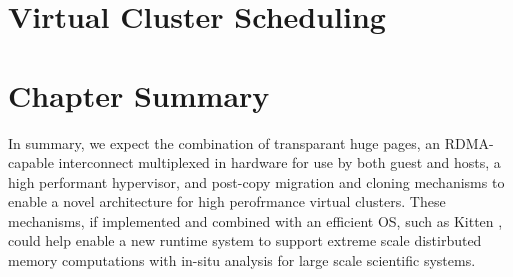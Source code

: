 \section{Virtual Cluster Scheduling}
\label{vcsched}




\section{Chapter Summary}
\label{chap7sum}



In summary, we expect the combination of transparant huge pages, an RDMA-capable interconnect multiplexed in hardware for use by both guest and hosts, a high performant hypervisor, and post-copy migration and cloning mechanisms to enable a novel architecture for high perofrmance virtual clusters. These mechanisms, if implemented and combined with an efficient OS, such as Kitten \cite{pedretti2011kitten}, could help enable a new runtime system to support extreme scale distirbuted memory computations with in-situ analysis \cite{ahrens2010visualization, vishwanath2011toward} for large scale scientific systems. 




